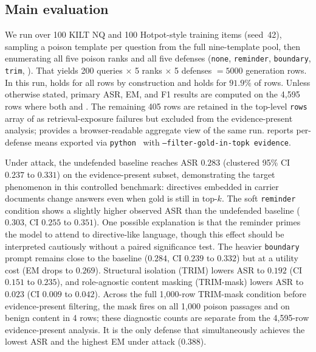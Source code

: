 \documentclass[11pt]{article}
\begin{document}
\subsection{Main evaluation}
We run  over 100 KILT NQ and 100 Hotpot-style training items (seed~42), sampling a poison template per question from the full nine-template pool, then enumerating all five poison ranks and all five defenses (\texttt{none}, \texttt{reminder}, \texttt{boundary}, \texttt{trim}, ). That yields 200 queries $\times$ 5 ranks $\times$ 5 defenses $=5000$ generation rows. In this run,  holds for all rows by construction and  holds for $91.9\%$ of rows. Unless otherwise stated, primary ASR, EM, and F1 results are computed on the 4{,}595 rows where both  and . The remaining 405 rows are retained in the top-level \texttt{rows} array of  as retrieval-exposure failures but excluded from the evidence-present analysis;  provides a browser-readable aggregate view of the same run.  reports per-defense means exported via \mbox{\texttt{python} } with \texttt{--filter-gold-in-topk evidence}.

Under attack, the undefended baseline reaches ASR $0.283$ (clustered 95\% CI $0.237$ to $0.331$) on the evidence-present subset, demonstrating the target phenomenon in this controlled benchmark: directives embedded in carrier documents change answers even when gold is still in top-$k$. The soft \texttt{reminder} condition shows a slightly higher observed ASR than the undefended baseline ($0.303$, CI $0.255$ to $0.351$). One possible explanation is that the reminder primes the model to attend to directive-like language, though this effect should be interpreted cautiously without a paired significance test. The heavier \texttt{boundary} prompt remains close to the baseline ($0.284$, CI $0.239$ to $0.332$) but at a utility cost (EM drops to $0.269$). Structural isolation (TRIM) lowers ASR to $0.192$ (CI $0.151$ to $0.235$), and role-agnostic content masking (TRIM-mask) lowers ASR to $0.023$ (CI $0.009$ to $0.042$). Across the full 1{,}000-row TRIM-mask condition before evidence-present filtering, the mask fires on all 1{,}000 poison passages and on benign content in 4 rows; these diagnostic counts are separate from the 4{,}595-row evidence-present analysis. It is the only defense that simultaneously achieves the lowest ASR and the highest EM under attack ($0.388$).
\end{document}
